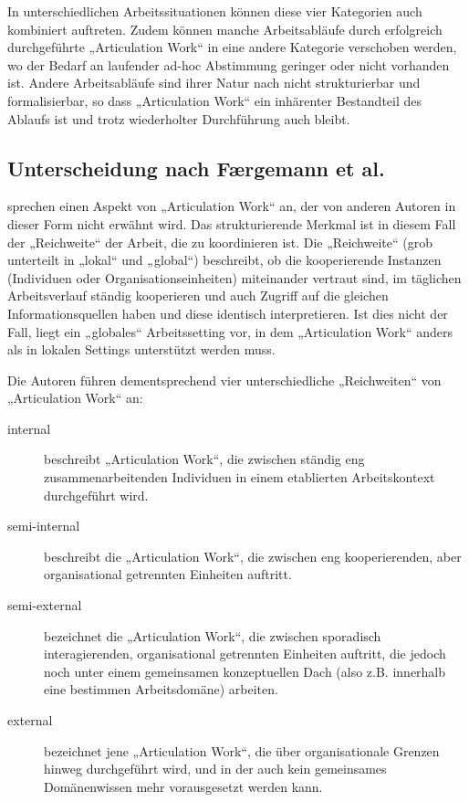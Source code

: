 In unterschiedlichen Arbeitssituationen können diese vier Kategorien auch kombiniert auftreten. Zudem können manche Arbeitsabläufe durch erfolgreich durchgeführte „Articulation Work“ in eine andere Kategorie verschoben werden, wo der Bedarf an laufender ad-hoc Abstimmung geringer oder nicht vorhanden ist. Andere Arbeitsabläufe sind ihrer Natur nach nicht strukturierbar und formalisierbar, so dass „Articulation Work“ ein inhärenter Bestandteil des Ablaufs ist und trotz wiederholter Durchführung auch bleibt.

\subsection{Unterscheidung nach Færgemann et al.} %
\label{sub:unterscheidung_nach_færgemann_et_al_}

\citet{Faergemann05} sprechen einen Aspekt von „Articulation Work“ an, der von anderen Autoren in dieser Form nicht erwähnt wird. Das strukturierende Merkmal ist in diesem Fall der „Reichweite“ der Arbeit, die zu koordinieren ist. Die „Reichweite“ (grob unterteilt in „lokal“ und „global“) beschreibt, ob die kooperierende Instanzen (Individuen oder Organisationseinheiten) miteinander vertraut sind, im täglichen Arbeitsverlauf ständig kooperieren und auch Zugriff auf die gleichen Informationsquellen haben und diese identisch interpretieren. Ist dies nicht der Fall, liegt ein „globales“ Arbeitssetting vor, in dem „Articulation Work“ anders als in lokalen Settings unterstützt werden muss.

Die Autoren führen dementsprechend vier unterschiedliche „Reichweiten“ von „Articulation Work“ an:
\begin{description}
	\item[internal] beschreibt „Articulation Work“, die zwischen ständig eng zusammenarbeitenden Individuen in einem etablierten Arbeitskontext durchgeführt wird.
	\item[semi-internal] beschreibt die „Articulation Work“, die zwischen eng kooperierenden, aber organisational getrennten Einheiten auftritt.
	\item[semi-external] bezeichnet die „Articulation Work“, die zwischen sporadisch interagierenden, organisational getrennten Einheiten auftritt, die jedoch noch unter einem gemeinsamen konzeptuellen Dach (also z.B. innerhalb eine bestimmen Arbeitsdomäne) arbeiten.
	\item[external] bezeichnet jene „Articulation Work“, die über organisationale Grenzen hinweg durchgeführt wird, und in der auch kein gemeinsames Domänenwissen mehr vorausgesetzt werden kann.
\end{description}

